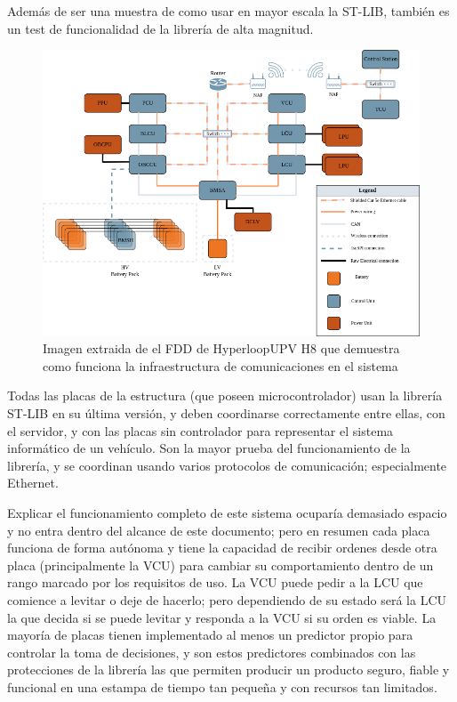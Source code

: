\documentclass{report}
\begin{document}
Además de ser una muestra de como usar en mayor escala la ST-LIB, también es un test de funcionalidad de la librería de alta magnitud. 
\begin{figure}[h]
  \includegraphics[scale=0.5]{Imagenes/Sense_and_Control_architecture.png}
  \caption{Imagen extraida de el FDD de HyperloopUPV H8 que demuestra como funciona la infraestructura de comunicaciones en el sistema}
\label{H8Structure}
\end{figure}
\par \vspace{0.3cm}
Todas las placas de la estructura (que poseen microcontrolador) usan la librería ST-LIB en su última versión, y deben coordinarse correctamente entre ellas, con el servidor, y con las placas sin controlador para representar el sistema informático de un vehículo. Son la mayor prueba del funcionamiento de la librería, y se coordinan usando varios protocolos de comunicación; especialmente Ethernet. 
\par \vspace{0.3cm}
Explicar el funcionamiento completo de este sistema ocuparía demasiado espacio y no entra dentro del alcance de este documento; pero en resumen cada placa funciona de forma autónoma y tiene la capacidad de recibir ordenes desde otra placa (principalmente la VCU) para cambiar su comportamiento dentro de un rango marcado por los requisitos de uso. La VCU puede pedir a la LCU que comience a levitar o deje de hacerlo; pero dependiendo de su estado será la LCU la que decida si se puede levitar y responda a la VCU si su orden es viable. La mayoría de placas tienen implementado al menos un predictor propio para controlar la toma de decisiones, y son estos predictores combinados con las protecciones de la librería las que permiten producir un producto seguro, fiable y funcional en una estampa de tiempo tan pequeña y con recursos tan limitados. 
\end{document}
